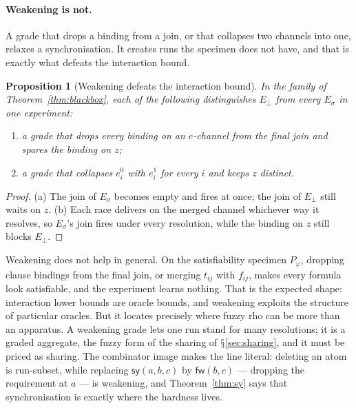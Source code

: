 \documentclass[11pt]{article}
\theoremstyle{definition}
\theoremstyle{plain}
\newtheorem{proposition}[definition]{Proposition}
\theoremstyle{remark}
\DeclareRobustCommand{\S}{\ifmmode\mathsection\else$\mathsection$\fi}
\newcommand{\cfw}{\mathsf{fw}}
\newcommand{\csy}{\mathsf{sy}}
\begin{document}
\paragraph{Weakening is not.} A grade that drops a binding from a join,
or that collapses two channels into one, relaxes a synchronisation. It
creates runs the specimen does not have, and that is exactly what defeats
the interaction bound.

\begin{proposition}[Weakening defeats the interaction bound]\label{prop:collapse}
In the family of Theorem~\ref{thm:blackbox}, each of the following
distinguishes $E_\bot$ from every $E_\sigma$ in one experiment:
\begin{enumerate}[label=(\alph*),leftmargin=2.2em,nosep]
\item a grade that drops every binding on an $e$-channel from the final
join and spares the binding on $z$;
\item a grade that collapses $e_i^0$ with $e_i^1$ for every $i$ and keeps
$z$ distinct.
\end{enumerate}
\end{proposition}

\begin{proof}
(a) The join of $E_\sigma$ becomes empty and fires at once; the join of
$E_\bot$ still waits on $z$. (b) Each race delivers on the merged channel
whichever way it resolves, so $E_\sigma$'s join fires under every
resolution, while the binding on $z$ still blocks $E_\bot$.
\end{proof}

\noindent
Weakening does not help in general. On the satisfiability specimen
$P_\varphi$, dropping clause bindings from the final join, or merging
$t_{ij}$ with $f_{ij}$, makes every formula look satisfiable, and the
experiment learns nothing. That is the expected shape: interaction lower
bounds are oracle bounds, and weakening exploits the structure of
particular oracles. But it locates precisely where fuzzy rho can be more
than an apparatus. A weakening grade lets one run stand for many
resolutions; it is a graded aggregate, the fuzzy form of the sharing of
\S\ref{sec:sharing}, and it must be priced as sharing. The combinator
image makes the line literal: deleting an atom is run-subset, while
replacing $\csy(a,b,c)$ by $\cfw(b,c)$ --- dropping the requirement at
$a$ --- is weakening, and Theorem~\ref{thm:sy} says that synchronisation
is exactly where the hardness lives.
\end{document}

